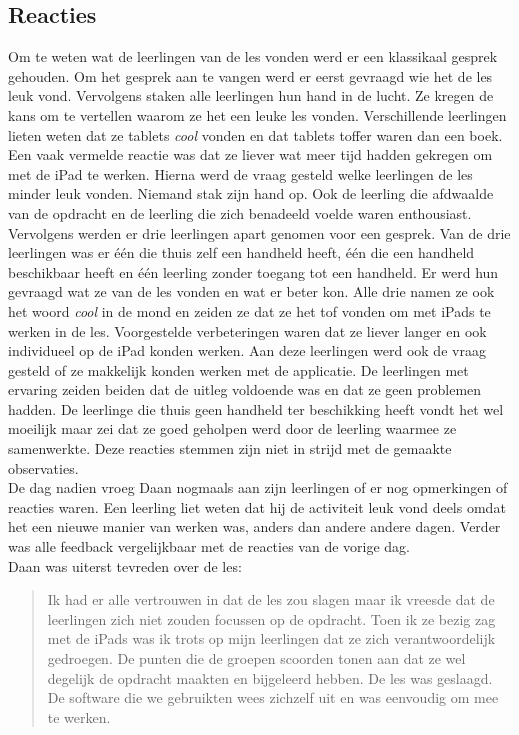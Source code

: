 \documentclass[pdftex,a4paper,12pt,twoside]{report}
\begin{document}
\subsection{Reacties}
Om te weten wat de leerlingen van de les vonden werd er een klassikaal gesprek gehouden. Om het gesprek aan te vangen werd er eerst gevraagd wie het de les leuk vond. Vervolgens staken alle leerlingen hun hand in de lucht. Ze kregen de kans om te vertellen waarom ze het een leuke les vonden. Verschillende leerlingen lieten weten dat ze tablets \textit{cool} vonden en dat tablets toffer waren dan een boek. Een vaak vermelde reactie was dat ze liever wat meer tijd hadden gekregen om met de iPad te werken. Hierna werd de vraag gesteld welke leerlingen de les minder leuk vonden. Niemand stak zijn hand op. Ook de leerling die afdwaalde van de opdracht en de leerling die zich benadeeld voelde waren enthousiast.\\ 

Vervolgens werden er drie leerlingen apart genomen voor een gesprek. Van de drie leerlingen was er \'e\'en die thuis zelf een handheld heeft, \'e\'en die een handheld beschikbaar heeft en \'e\'en leerling zonder toegang tot een handheld. Er werd hun gevraagd wat ze van de les vonden en wat er beter kon. Alle drie namen ze ook het woord \textit{cool} in de mond en zeiden ze dat ze het tof vonden om met iPads te werken in de les. Voorgestelde verbeteringen waren dat ze liever langer en ook individueel op de iPad konden werken. Aan deze leerlingen werd ook de vraag gesteld of ze makkelijk konden werken met de applicatie. De leerlingen met ervaring zeiden beiden dat de uitleg voldoende was en dat ze geen problemen hadden. De leerlinge die thuis geen handheld ter beschikking heeft vondt het wel moeilijk maar zei dat ze goed geholpen werd door de leerling waarmee ze samenwerkte. Deze reacties stemmen zijn niet in strijd met de gemaakte observaties. \\

De dag nadien vroeg Daan nogmaals aan zijn leerlingen of er nog opmerkingen of reacties waren. Een leerling liet weten dat hij de activiteit leuk vond deels omdat het een nieuwe manier van werken was, anders dan andere andere dagen. Verder was alle feedback vergelijkbaar met de reacties van de vorige dag. \\ 



Daan was uiterst tevreden over de les: 
\begin{quote}
Ik had er alle vertrouwen in dat de les zou slagen maar ik vreesde dat de leerlingen zich niet zouden focussen op de opdracht. Toen ik ze bezig zag met de iPads was ik trots op mijn leerlingen dat ze zich verantwoordelijk gedroegen. De punten die de groepen scoorden tonen aan dat ze wel degelijk de opdracht maakten en bijgeleerd hebben. De les was geslaagd. De software die we gebruikten wees zichzelf uit en was eenvoudig om mee te werken.
\end{quote}
\end{document}
